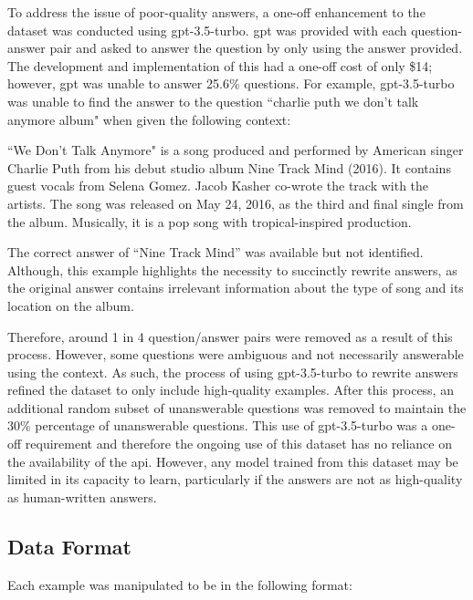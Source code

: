 To address the issue of poor-quality answers, a one-off enhancement to the dataset was conducted using gpt-3.5-turbo. \acrshort{gpt} was provided with each question-answer pair and asked to answer the question by only using the answer provided. The development and implementation of this had a one-off cost of only \$14; however, \acrshort{gpt} was unable to answer 25.6\% questions. For example, gpt-3.5-turbo was unable to find the answer to the question ``charlie puth we don't talk anymore album" when given the following context:

\begin{itquote}
    ``We Don't Talk Anymore" is a song produced and performed by American singer Charlie Puth from his debut studio album Nine Track Mind (2016). It contains guest vocals from Selena Gomez. Jacob Kasher co-wrote the track with the artists. The song was released on May 24, 2016, as the third and final single from the album. Musically, it is a pop song with tropical-inspired production.
\end{itquote}

The correct answer of ``Nine Track Mind'' was available but not identified. Although, this example highlights the necessity to succinctly rewrite answers, as the original answer contains irrelevant information about the type of song and its location on the album.

Therefore, around 1 in 4 question/answer pairs were removed as a result of this process. However, some questions were ambiguous and not necessarily answerable using the context. As such, the process of using gpt-3.5-turbo to rewrite answers refined the dataset to only include high-quality examples. After this process, an additional random subset of unanswerable questions was removed to maintain the 30\% percentage of unanswerable questions. This use of gpt-3.5-turbo was a one-off requirement and therefore the ongoing use of this dataset has no reliance on the availability of the \acrshort{api}. However, any model trained from this dataset may be limited in its capacity to learn, particularly if the answers are not as high-quality as human-written answers.


\subsection{Data Format}
Each example was manipulated to be in the following format:

